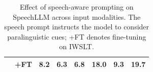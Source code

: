 \begin{table}[t]
\begin{tabular}{ll|rrr|rrr}
 & \quad+FT & \cellcolor[RGB]{255,255,255}8.2 & \cellcolor[RGB]{255,255,255}6.3 & \cellcolor[RGB]{255,255,255}6.8 & \cellcolor[RGB]{255,255,255}18.0 & \cellcolor[RGB]{255,255,255}9.3 & \cellcolor[RGB]{255,255,255}19.7 \\
\bottomrule
\end{tabular}
\caption{Effect of speech-aware prompting on SpeechLLM across input modalities. The speech prompt instructs the model to consider paralinguistic cues; +FT denotes fine-tuning on IWSLT.}\label{tab:speechllm_prompt}
\end{table}
